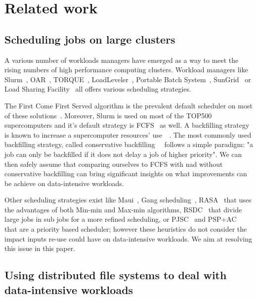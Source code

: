 \documentclass[conference,10pt]{IEEEtran}
\begin{document}
\section{Related work}\label{sec.related_work}

\subsection{Scheduling jobs on large clusters}

A various number of workloads managers have emerged 
as a way to meet the rising numbers of high performance computing clusters.
Workload managers like Slurm~\cite{SLURM}, OAR~\cite{oar},
TORQUE~\cite{torque}, LoadLeveler~\cite{loadleveler},
Portable Batch System~\cite{pbs}, SunGrid~\cite{sungrid}
or Load Sharing Facility~\cite{lsf} all offers 
various scheduling strategies.

The First Come First Served algorithm is the prevalent default
scheduler on most of these solutions~\cite{survey_workload_manager_and_scheduler}.
Moreover, Slurm is used on most of the TOP500 supercomputers and it's default strategy is FCFS~\cite{slurm_website_scheduling} as well.
A backfilling strategy is known to increase
a supercomputer resources' use~\cite{maui}~\cite{New_Backfill}. 
The most commonly used backfilling strategy, called conservative 
backfilling~\cite{Characterization_of_Backfilling}~\cite{Introducing-New-Backfill-based} follows
a simple paradigm: "a job can only be backfilled if it does not
delay a job of higher priority".
We can then safely assume that comparing ourselves to FCFS with nad without conservative backfilling can 
bring significant insights on what improvements can be achieve on data-intensive workloads.

Other scheduling strategies exist like 
Maui~\cite{Maui_Scheduler}, Gang scheduling~\cite{gang_scheduling}, 
RASA~\cite{rasa} that uses the advantages of both Min-min and Max-min algorithms,
RSDC~\cite{rsdc} that divide large jobs in sub jobs for a more refined scheduling,
or PJSC~\cite{pjsc} and PSP+AC~\cite{PSP_AC} that are a priority based scheduler; 
however these heuristics do not consider the impact
inputs re-use could have on data-intensive workloads.
We aim at resolving this issue in this paper.

\subsection{Using distributed file systems to deal with data-intensive workloads}
\end{document}
